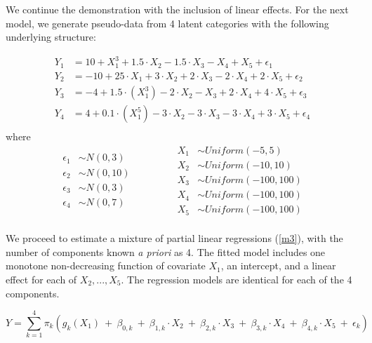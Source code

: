 \documentclass[10pt]{olplainarticle}\usepackage[]{graphicx}\usepackage[]{color}
\begin{document}
We continue the demonstration with the inclusion of linear effects. For the next model, we generate pseudo-data from 4 latent categories with the following underlying structure:


\begin{align*}
  Y_{1} &= 10 + X_1^3 + 1.5\cdot X_2 - 1.5\cdot X_3 - X_4 + X_5 + \epsilon_1 \\
  Y_{2} &= -10 + 25 \cdot X_1 + 3\cdot X_2 + 2\cdot X_3 - 2\cdot X_4 + 2\cdot X_5 + \epsilon_2 \\
  Y_{3} &= -4 + 1.5 \cdot (X_1^3) - 2\cdot X_2 - X_3 + 2\cdot X_4 + 4\cdot X_5 + \epsilon_3 \\
  Y_{4} &= 4 + 0.1 \cdot (X_1^5) - 3\cdot X_2 - 3\cdot X_3 - 3\cdot X_4 + 3\cdot X_5 + \epsilon_4 \\
\end{align*}
where 
\begin{equation*}
\begin{aligned}
  \epsilon_1 &\sim N(0,3) \\
  \epsilon_2 &\sim N(0,10) \\
  \epsilon_3 &\sim N(0,3) \\
  \epsilon_4 &\sim N(0,7) \\
\end{aligned}
\qquad
\qquad
\begin{aligned}
  X_1 &\sim Uniform(-5,5) \\
  X_2 &\sim Uniform(-10,10) \\
  X_3 &\sim Uniform(-100,100) \\
  X_4 &\sim Uniform(-100,100) \\
  X_5 &\sim Uniform(-100,100) \\
\end{aligned}
\end{equation*}


We proceed to estimate a mixture of partial linear regressions (\ref{m3}), with the number of components known \emph{a priori} as 4. The fitted model includes one monotone non-decreasing function of covariate $X_1$, an intercept, and a linear effect for each of $X_2,...,X_5$. The regression models are identical for each of the 4 components.

\begin{equation} \label{m3}
  Y = \sum_{k=1}^{4}\pi_k (g_{k} (X_1) \ +\  \beta_{0,k} \ +\ \beta_{1,k}\cdot X_2 \ +\ \beta_{2,k}\cdot X_3 \ +\ \beta_{3,k}\cdot X_4 \ +\ \beta_{4,k}\cdot X_5 \ +\ \epsilon_k)
\end{equation}
\end{document}
